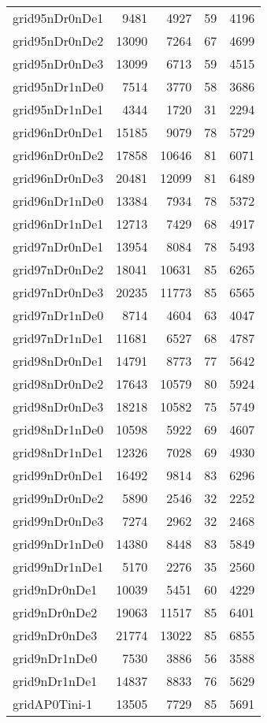 \begin{longtable}{lrrrr}
grid95nDr0nDe1 & 9481 & 4927 & 59 & 4196 \\
grid95nDr0nDe2 & 13090 & 7264 & 67 & 4699 \\
grid95nDr0nDe3 & 13099 & 6713 & 59 & 4515 \\
grid95nDr1nDe0 & 7514 & 3770 & 58 & 3686 \\
grid95nDr1nDe1 & 4344 & 1720 & 31 & 2294 \\
grid96nDr0nDe1 & 15185 & 9079 & 78 & 5729 \\
grid96nDr0nDe2 & 17858 & 10646 & 81 & 6071 \\
grid96nDr0nDe3 & 20481 & 12099 & 81 & 6489 \\
grid96nDr1nDe0 & 13384 & 7934 & 78 & 5372 \\
grid96nDr1nDe1 & 12713 & 7429 & 68 & 4917 \\
grid97nDr0nDe1 & 13954 & 8084 & 78 & 5493 \\
grid97nDr0nDe2 & 18041 & 10631 & 85 & 6265 \\
grid97nDr0nDe3 & 20235 & 11773 & 85 & 6565 \\
grid97nDr1nDe0 & 8714 & 4604 & 63 & 4047 \\
grid97nDr1nDe1 & 11681 & 6527 & 68 & 4787 \\
grid98nDr0nDe1 & 14791 & 8773 & 77 & 5642 \\
grid98nDr0nDe2 & 17643 & 10579 & 80 & 5924 \\
grid98nDr0nDe3 & 18218 & 10582 & 75 & 5749 \\
grid98nDr1nDe0 & 10598 & 5922 & 69 & 4607 \\
grid98nDr1nDe1 & 12326 & 7028 & 69 & 4930 \\
grid99nDr0nDe1 & 16492 & 9814 & 83 & 6296 \\
grid99nDr0nDe2 & 5890 & 2546 & 32 & 2252 \\
grid99nDr0nDe3 & 7274 & 2962 & 32 & 2468 \\
grid99nDr1nDe0 & 14380 & 8448 & 83 & 5849 \\
grid99nDr1nDe1 & 5170 & 2276 & 35 & 2560 \\
grid9nDr0nDe1 & 10039 & 5451 & 60 & 4229 \\
grid9nDr0nDe2 & 19063 & 11517 & 85 & 6401 \\
grid9nDr0nDe3 & 21774 & 13022 & 85 & 6855 \\
grid9nDr1nDe0 & 7530 & 3886 & 56 & 3588 \\
grid9nDr1nDe1 & 14837 & 8833 & 76 & 5629 \\
gridAP0Tini-1 & 13505 & 7729 & 85 & 5691 \\

\end{longtable}
